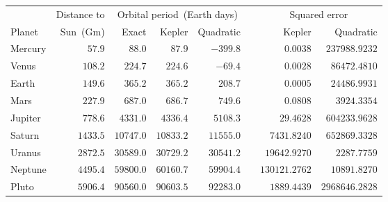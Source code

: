 \begin{tabular}{lrrrrrrr}                                                                            \toprule
        & Distance to & \multicolumn{3}{c}{Orbital period~(Earth days)} && \multicolumn{2}{c}{Squared error} \\
  \cmidrule{3-5} \cmidrule{7-8}
Planet  & Sun~(Gm)    & Exact     & Kepler    & Quadratic && Kepler        & Quadratic      \\\midrule
Mercury & $57.9$      & $88.0$    & $87.9$    & $-399.8$  && $0.0038$      & $237988.9232$  \\[4pt]
Venus   & $108.2$     & $224.7$   & $224.6$   & $-69.4$   && $0.0028$      & $86472.4810$   \\[4pt]
Earth   & $149.6$     & $365.2$   & $365.2$   & $208.7$   && $0.0005$      & $24486.9931$   \\[4pt]
Mars    & $227.9$     & $687.0$   & $686.7$   & $749.6$   && $0.0808$      & $3924.3354$    \\[4pt]
Jupiter & $778.6$     & $4331.0$  & $4336.4$  & $5108.3$  && $29.4628$     & $604233.9628$  \\[4pt]
Saturn  & $1433.5$    & $10747.0$ & $10833.2$ & $11555.0$ && $7431.8240$   & $652869.3328$  \\[4pt]
Uranus  & $2872.5$    & $30589.0$ & $30729.2$ & $30541.2$ && $19642.9270$  & $2287.7759$    \\[4pt]
Neptune & $4495.4$    & $59800.0$ & $60160.7$ & $59904.4$ && $130121.2762$ & $10891.8270$   \\[4pt]
Pluto   & $5906.4$    & $90560.0$ & $90603.5$ & $92283.0$ && $1889.4439$   & $2968646.2828$ \\\bottomrule
\end{tabular}
